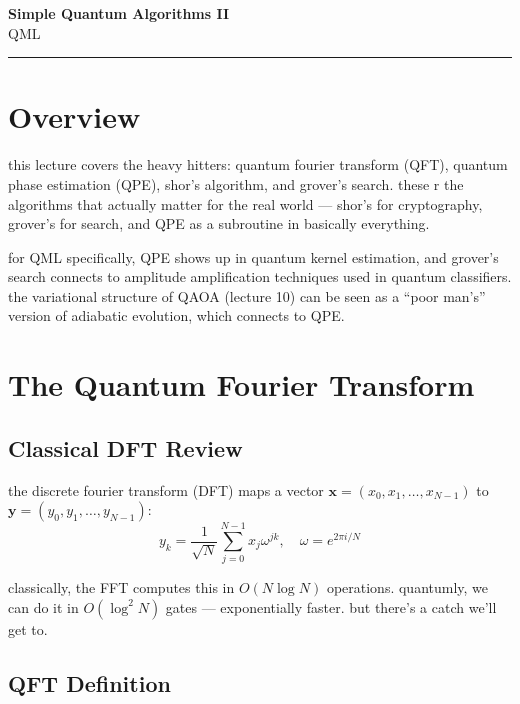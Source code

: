 \documentclass[11pt,a4paper]{article}
\theoremstyle{definition}
\theoremstyle{remark}
\begin{document}
\begin{center}
    {\LARGE \textbf{Simple Quantum Algorithms II}}\\[8pt]
    {\large QML}\\[12pt]
    \hrule
\end{center}

\vspace{12pt}
\tableofcontents
\newpage

\section{Overview}

this lecture covers the heavy hitters: quantum fourier transform (QFT), quantum phase estimation (QPE), shor's algorithm, and grover's search. these r the algorithms that actually matter for the real world --- shor's for cryptography, grover's for search, and QPE as a subroutine in basically everything.

for QML specifically, QPE shows up in quantum kernel estimation, and grover's search connects to amplitude amplification techniques used in quantum classifiers. the variational structure of QAOA (lecture 10) can be seen as a ``poor man's'' version of adiabatic evolution, which connects to QPE.

\section{The Quantum Fourier Transform}

\subsection{Classical DFT Review}

the discrete fourier transform (DFT) maps a vector $\mathbf{x} = (x_0, x_1, \ldots, x_{N-1})$ to $\mathbf{y} = (y_0, y_1, \ldots, y_{N-1})$:
\[
y_k = \frac{1}{\sqrt{N}}\sum_{j=0}^{N-1} x_j \omega^{jk}, \quad \omega = e^{2\pi i/N}
\]

classically, the FFT computes this in $O(N \log N)$ operations. quantumly, we can do it in $O(\log^2 N)$ gates --- exponentially faster. but there's a catch we'll get to.

\subsection{QFT Definition}
\end{document}
